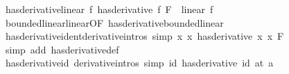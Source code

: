 \begin{isabellebody}
\endisatagproof
{\isafoldproof}%
%
\isadelimproof
\isanewline
%
\endisadelimproof
\isanewline
{}\isamarkupfalse%
\ has{\isacharunderscore}{\kern0pt}derivative{\isacharunderscore}{\kern0pt}linear{\isacharcolon}{\kern0pt}\ {\isachardoublequoteopen}{\isacharparenleft}{\kern0pt}f\ has{\isacharunderscore}{\kern0pt}derivative\ f{\isacharprime}{\kern0pt}{\isacharparenright}{\kern0pt}\ F\ {\isasymLongrightarrow}\ linear\ f{\isacharprime}{\kern0pt}{\isachardoublequoteclose}\isanewline
%
\isadelimproof
\ \ %
\endisadelimproof
%
\isatagproof
{}\isamarkupfalse%
\ bounded{\isacharunderscore}{\kern0pt}linear{\isachardot}{\kern0pt}linear{\isacharbrackleft}{\kern0pt}OF\ has{\isacharunderscore}{\kern0pt}derivative{\isacharunderscore}{\kern0pt}bounded{\isacharunderscore}{\kern0pt}linear{\isacharbrackright}{\kern0pt}\ \isacommand{{\isachardot}{\kern0pt}}\isamarkupfalse%
%
\endisatagproof
{\isafoldproof}%
%
\isadelimproof
\isanewline
%
\endisadelimproof
\isanewline
{}\isamarkupfalse%
\ has{\isacharunderscore}{\kern0pt}derivative{\isacharunderscore}{\kern0pt}ident{\isacharbrackleft}{\kern0pt}derivative{\isacharunderscore}{\kern0pt}intros{\isacharcomma}{\kern0pt}\ simp{\isacharbrackright}{\kern0pt}{\isacharcolon}{\kern0pt}\ {\isachardoublequoteopen}{\isacharparenleft}{\kern0pt}{\isacharparenleft}{\kern0pt}{\isasymlambda}x{\isachardot}{\kern0pt}\ x{\isacharparenright}{\kern0pt}\ has{\isacharunderscore}{\kern0pt}derivative\ {\isacharparenleft}{\kern0pt}{\isasymlambda}x{\isachardot}{\kern0pt}\ x{\isacharparenright}{\kern0pt}{\isacharparenright}{\kern0pt}\ F{\isachardoublequoteclose}\isanewline
%
\isadelimproof
\ \ %
\endisadelimproof
%
\isatagproof
{}\isamarkupfalse%
\ {\isacharparenleft}{\kern0pt}simp\ add{\isacharcolon}{\kern0pt}\ has{\isacharunderscore}{\kern0pt}derivative{\isacharunderscore}{\kern0pt}def{\isacharparenright}{\kern0pt}%
\endisatagproof
{\isafoldproof}%
%
\isadelimproof
\isanewline
%
\endisadelimproof
\isanewline
{}\isamarkupfalse%
\ has{\isacharunderscore}{\kern0pt}derivative{\isacharunderscore}{\kern0pt}id\ {\isacharbrackleft}{\kern0pt}derivative{\isacharunderscore}{\kern0pt}intros{\isacharcomma}{\kern0pt}\ simp{\isacharbrackright}{\kern0pt}{\isacharcolon}{\kern0pt}\ {\isachardoublequoteopen}{\isacharparenleft}{\kern0pt}id\ has{\isacharunderscore}{\kern0pt}derivative\ id{\isacharparenright}{\kern0pt}\ {\isacharparenleft}{\kern0pt}at\ a{\isacharparenright}{\kern0pt}{\isachardoublequoteclose}\isanewline
%
\isadelimproof
\ \ %
\endisadelimproof
%
\isatagproof
{}\isamarkupfalse%

\end{isabellebody}

